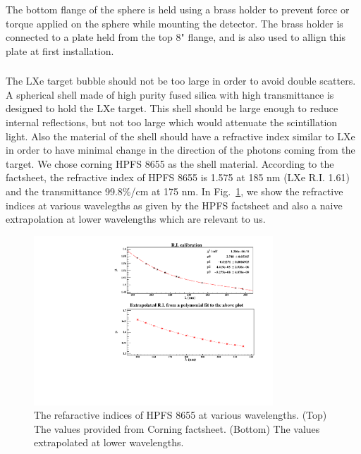 The bottom flange of the sphere is held using a brass holder to prevent force or torque applied on the sphere while mounting the detector. The 
brass holder is connected to a plate held from the top 8" flange, and is also used to allign this plate at first installation. 

\subsubsection{}
\label{subsubsec:detchamber}

The LXe target bubble should not be too large in order to avoid double scatters. A spherical shell made of high purity fused silica 
with high transmittance is designed to hold the LXe target. This shell should be large enough to reduce internal reflections, but not too large which would 
attenuate the scintillation light. Also the material of the shell should have a refractive index similar to LXe in order to have 
minimal change in the direction of the photons coming from the target. We chose corning HPFS 8655 as the shell material. According 
to the factsheet, the refractive index of HPFS 8655 is 1.575 at 185 nm (LXe R.I. 1.61) and the transmittance 99.8\%/cm at 175 nm. 
In Fig.~\ref{fig:hpfsRIcalibration}, we show the refractive indices at various wavelegths as given by the HPFS factsheet and also 
a naive extrapolation at lower wavelengths which are relevant to us.

\begin{figure}
   \centering
   \includegraphics[width=0.8\textwidth]{RI-calibration.pdf}
   \caption{The refaractive indices of HPFS 8655 at various wavelengths. (Top) The values provided from Corning factsheet.
   (Bottom) The values extrapolated at lower wavelengths.} 
   \label{fig:hpfsRIcalibration}
\end{figure}

